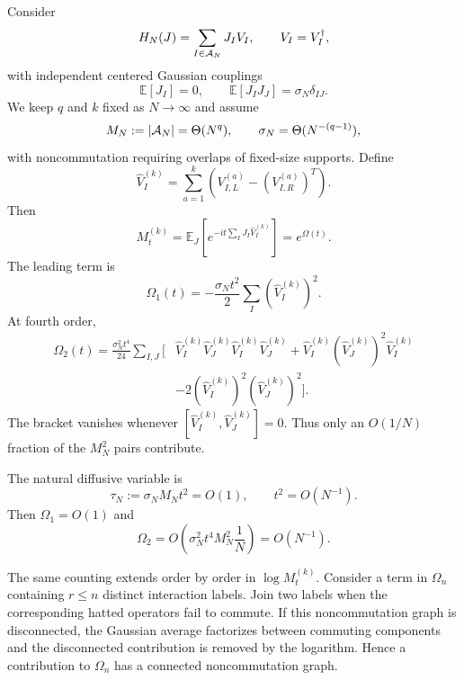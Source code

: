 \documentclass{article}
\theoremstyle{definition}
\begin{document}
Consider
\begin{equation}
    H_N(J)=\sum_{I\in{\cal A}_N}J_IV_I,
    \qquad
    V_I=V_I^\dagger,
\end{equation}
with independent centered Gaussian couplings
\begin{equation}
    \mathbb E[J_I]=0,
    \qquad
    \mathbb E[J_IJ_J]=\sigma_N\delta_{IJ}.
\end{equation}
We keep $q$ and $k$ fixed as $N\to\infty$ and assume
\begin{equation}
    M_N:=|{\cal A}_N|=\Theta(N^q),
    \qquad
    \sigma_N=\Theta(N^{-(q-1)}),
\end{equation}
with noncommutation requiring overlaps of fixed-size supports.  Define
\begin{equation}
    \widehat V_I^{(k)}
    =\sum_{a=1}^k
    \left(V_{I,L}^{(a)}-(V_{I,R}^{(a)})^T\right).
\end{equation}
Then
\begin{equation}
    M_t^{(k)}
    =\mathbb E_J\!\left[
       e^{-it\sum_IJ_I\widehat V_I^{(k)}}
    \right]
    =e^{\Omega(t)}.
\end{equation}
The leading term is
\begin{equation}
    \Omega_1(t)
    =-\frac{\sigma_Nt^2}{2}
    \sum_I(\widehat V_I^{(k)})^2.
\end{equation}
At fourth order,
\begin{align}
    \Omega_2(t)
    =\frac{\sigma_N^2t^4}{24}
    \sum_{I,J}
    \bigg[&
       \widehat V_I^{(k)}\widehat V_J^{(k)}
       \widehat V_I^{(k)}\widehat V_J^{(k)}
       +\widehat V_I^{(k)}(\widehat V_J^{(k)})^2
        \widehat V_I^{(k)}
       \nonumber\\
       &-2(\widehat V_I^{(k)})^2(\widehat V_J^{(k)})^2
    \bigg].
\end{align}
The bracket vanishes whenever
$[\widehat V_I^{(k)},\widehat V_J^{(k)}]=0$.  Thus only an $O(1/N)$
fraction of the $M_N^2$ pairs contribute.

The natural diffusive variable is
\begin{equation}
    \tau_N:=\sigma_NM_Nt^2=O(1),
    \qquad
    t^2=O(N^{-1}).
\end{equation}
Then $\Omega_1=O(1)$ and
\begin{equation}
    \Omega_2
    =O\!\left(
       \sigma_N^2t^4M_N^2\frac1N
    \right)
    =O(N^{-1}).
\end{equation}

The same counting extends order by order in $\log M_t^{(k)}$.  Consider a
term in $\Omega_n$ containing $r\le n$ distinct interaction labels.  Join
two labels when the corresponding hatted operators fail to commute.  If
this noncommutation graph is disconnected, the Gaussian average factorizes
between commuting components and the disconnected contribution is removed
by the logarithm.  Hence a contribution to $\Omega_n$ has a connected
noncommutation graph.
\end{document}
